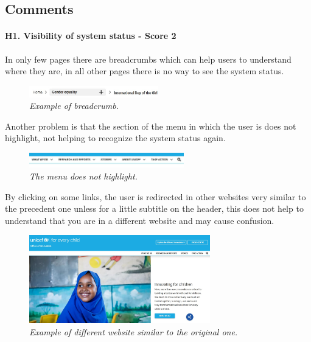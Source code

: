 \endgroup


\clearpage

\subsection*{Comments}
\paragraph{H1. Visibility of system status - Score 2}	In only few pages there are breadcrumbs which can help users to understand where they are, in all other pages there is no way to see the system status.
\begin{figure}[!h]
	\begin{center}
		\includegraphics[width=0.5\textwidth]{FinalScores1.jpg}
		\captionsetup{font=small}
		\caption{\textit{Example of breadcrumb.}}
	\end{center}
\end{figure}
\newline Another problem is that the section of the menu in which the user is does not highlight, not helping to recognize the system status again.
\begin{figure}[!h]
	\begin{center}
		\includegraphics[width=0.6\textwidth]{FinalScores2.jpg}
		\captionsetup{font=small}
		\caption{\textit{The menu does not highlight.}}
	\end{center}
\end{figure}
\newline By clicking on some links, the user is redirected in other websites very similar to the precedent one unless for a little subtitle on the header, this does not help to understand that you are in a different website and may cause confusion.
\begin{figure}[!h]
	\begin{center}
		\includegraphics[width=0.7\textwidth]{FinalScores3.jpg}
		\captionsetup{font=small}
		\caption{\textit{Example of different website similar to the original one.}}
	\end{center}
\end{figure}
\newline
